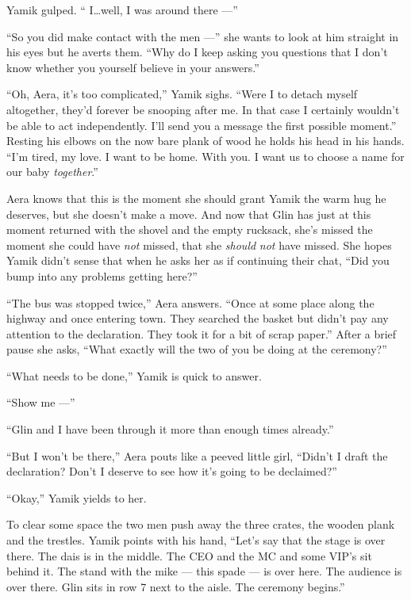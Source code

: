 \documentclass[twoside,11pt]{book}
\begin{document}
Yamik gulped. `` I{\ldots}well, I was around there ---''

``So you did make contact with the men ---'' she wants to look at
him{ }straight in his eyes but he averts them. ``Why do I keep
asking you questions that I don't know whether you yourself believe in your answers.''

``Oh, Aera, it's too complicated,'' Yamik sighs. ``Were I to detach myself
altogether, they'd forever be snooping after me. In that case I certainly wouldn't be able to act independently. I'll
send you a message the first possible moment.'' Resting his elbows on the now bare plank of wood he holds
his head in his hands. ``I'm tired, my love. I want to be home. With you. I want
us{ }to choose a name for our baby \textit{together}.''

Aera knows that this is the moment she should grant Yamik the warm hug he deserves, but she doesn't make a move. And
now that Glin has just at this moment returned with the shovel and the empty rucksack, she's missed the moment she
could have \textit{not} missed, that she \textit{should} \textit{not} have missed. She hopes Yamik didn't sense that
when he asks her as if continuing their chat, ``Did you bump into any problems getting
here?''

``The bus was stopped twice,'' Aera answers. ``Once at some place along the
highway and once entering town. They searched the basket but didn't pay any attention to the declaration. They took it
for a bit of scrap paper.'' After a brief pause she asks, ``What exactly will the two of you
be doing at the ceremony?''

``What needs to be done,'' Yamik is quick to answer.

``Show me ---''

``Glin and I have been through it more than enough times already.''

``But I won't be there,'' Aera pouts like a peeved little girl, ``Didn't I
draft the declaration? Don't I deserve to see how it's going to be declaimed?''

``Okay,'' Yamik yields to her.

To clear some space the two  men push away the three crates, the wooden plank and the
trestles{.} Yamik points with his hand, ``Let's say that the stage
is over there. The dais is in the middle. The CEO and the MC and some VIP's sit behind it. The stand with the mike
--- this spade --- is over here. The audience is over there. Glin sits in row 7 next to the aisle. The ceremony
begins.''
\end{document}
